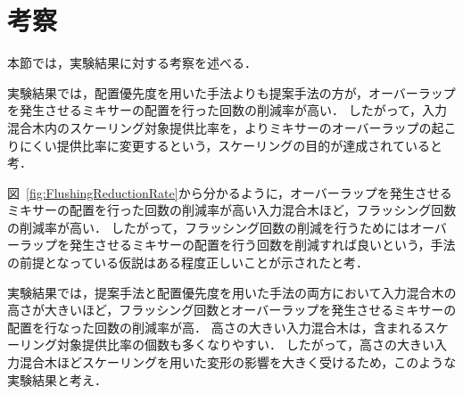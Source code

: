 \section{考察}
本節では，実験結果に対する考察を述べる．

実験結果では，配置優先度を用いた手法よりも提案手法の方が，オーバーラップを発生させるミキサーの配置を行った回数の削減率が高い．
したがって，入力混合木内のスケーリング対象提供比率を，よりミキサーのオーバーラップの起こりにくい提供比率に変更するという，スケーリングの目的が達成されていると考．

図~\ref{fig:FlushingReductionRate}から分かるように，オーバーラップを発生させるミキサーの配置を行った回数の削減率が高い入力混合木ほど，フラッシング回数の削減率が高い．
したがって，フラッシング回数の削減を行うためにはオーバーラップを発生させるミキサーの配置を行う回数を削減すれば良いという，手法の前提となっている仮説はある程度正しいことが示されたと考．

実験結果では，提案手法と配置優先度を用いた手法の両方において入力混合木の高さが大きいほど，フラッシング回数とオーバーラップを発生させるミキサーの配置を行なった回数の削減率が高．
高さの大きい入力混合木は，含まれるスケーリング対象提供比率の個数も多くなりやすい．
したがって，高さの大きい入力混合木ほどスケーリングを用いた変形の影響を大きく受けるため，このような実験結果と考え．

